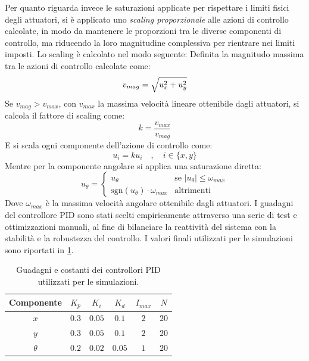 Per quanto riguarda invece le saturazioni applicate per rispettare i limiti fisici degli attuatori, si è applicato uno \textit{scaling proporzionale} alle azioni di controllo calcolate, in modo da mantenere le proporzioni tra le diverse componenti di controllo, ma riducendo la loro magnitudine complessiva per rientrare nei limiti imposti. Lo scaling è calcolato nel modo seguente:
Definita la magnitudo massima tra le azioni di controllo calcolate come:
\begin{equation}\label{eq:v_mag}
    v_{mag} = \sqrt{u_x^2 + u_y^2}\\
\end{equation}
Se $v_{mag} > v_{max}$, con $v_{max}$ la massima velocità lineare ottenibile dagli attuatori, si calcola il fattore di scaling come:
\begin{equation}\label{eq:scaling_factor}
    k= \frac{v_{max}}{v_{mag}}
\end{equation}
E si scala ogni componente dell'azione di controllo come:
\begin{equation}\label{eq:scaled_control_action}
    u_i = k u_i \quad , \quad i \in \{x,y\}
\end{equation}
Mentre per la componente angolare si applica una saturazione diretta:
\begin{equation}\label{eq:angular_saturation}
    u_\theta = \begin{cases}
        u_\theta                                & \text{se } |u_\theta| \leq \omega_{max} \\
        \text{sgn}(u_\theta) \cdot \omega_{max} & \text{altrimenti}
    \end{cases}
\end{equation}
Dove $\omega_{max}$ è la massima velocità angolare ottenibile dagli attuatori.
I guadagni del controllore PID sono stati scelti empiricamente attraverso una serie di test e ottimizzazioni manuali, al fine di bilanciare la reattività del sistema con la stabilità e la robustezza del controllo. I valori finali utilizzati per le simulazioni sono riportati in \cref{tab:pid_gains}.
\begin{table}[h]
    \centering
    \begin{tabular}{|c|c|c|c|c|c|}
        \hline
        \textbf{Componente} & \textbf{$K_p$} & \textbf{$K_i$} & \textbf{$K_d$} & $I_{max}$ & $N$  \\
        \hline
        $x$                 & $0.3$          & $0.05$         & $0.1$          & $2$       & $20$ \\
        \hline
        $y$                 & $0.3$          & $0.05$         & $0.1$          & $2$       & $20$ \\
        \hline
        $\theta$            & $0.2$          & $0.02$         & $0.05$         & $1$       & $20$ \\
        \hline

        \hline
    \end{tabular}
    \caption{Guadagni e costanti dei controllori PID utilizzati per le simulazioni.}
    \label{tab:pid_gains}
\end{table}
